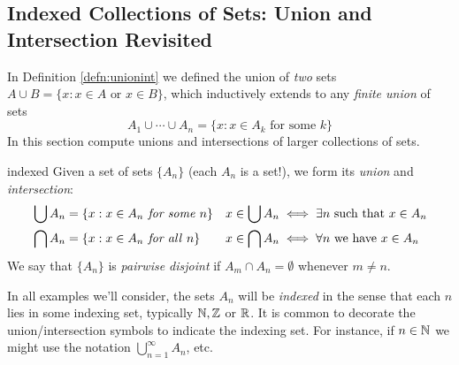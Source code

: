\clearpage



\subsection{Indexed Collections of Sets: Union and Intersection Revisited}\label{sec:indexed}

In Definition \ref{defn:unionint} we defined the union of \emph{two} sets $A\cup B=\{x:x\in A\text{ or }x\in B\}$, which inductively extends to any \emph{finite union} of sets
\[
	A_1\cup\cdots\cup A_n=\{x:x\in A_k\text{ for some }k\}
\]
In this section compute unions and intersections of larger collections of sets.

\begin{defn}{}{indexed}
	Given a set of sets $\{A_n\}$ (each $A_n$ is a set!), we form its \emph{union} and \emph{intersection}:
	\begin{align*}
		&\bigcup A_n=\{x:x\in A_n\text{\emph{ for some} }n\} &&x\in\bigcup A_n\iff \exists n\text{ such that }x\in A_n\\
		&\bigcap A_n=\{x:x\in A_n\text{\emph{ for all} }n\} &&x\in\bigcap A_n\iff \forall n\text{ we have }x\in A_n
	\end{align*}
	We say that $\{A_n\}$ is \emph{pairwise disjoint} if $A_m\cap A_n=\emptyset$ whenever $m\neq n$.
\end{defn}

In all examples we'll consider, the sets $A_n$ will be \emph{indexed} in the sense that each $n$ lies in some indexing set, typically $\mathbb{N},\mathbb{Z}$ or $\mathbb{R}$. It is common to decorate the union/intersection symbols to indicate the indexing set. For instance, if $n\in\mathbb{N}$ we might use the notation $\bigcup\limits_{n=1}^\infty A_n$, etc.



